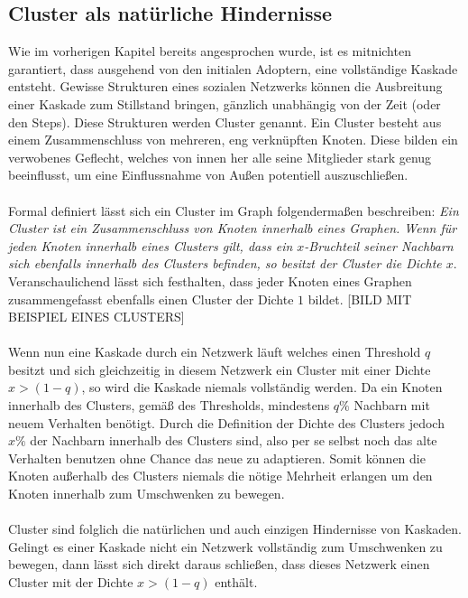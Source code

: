 \documentclass[12pt]{article}
\begin{document}
\subsection{Cluster als natürliche Hindernisse}
\label{ss_cluster}
Wie im vorherigen Kapitel bereits angesprochen wurde, ist es mitnichten garantiert, dass ausgehend von den initialen Adoptern, eine vollständige Kaskade entsteht. Gewisse Strukturen eines sozialen Netzwerks können die Ausbreitung einer Kaskade zum Stillstand bringen, gänzlich unabhängig von der Zeit (oder den Steps). Diese Strukturen werden Cluster genannt. Ein Cluster besteht aus einem Zusammenschluss von mehreren, eng verknüpften Knoten. Diese bilden ein verwobenes Geflecht, welches von innen her alle seine Mitglieder stark genug beeinflusst, um eine Einflussnahme von Außen potentiell auszuschließen.\\\\
Formal definiert lässt sich ein Cluster im Graph folgendermaßen beschreiben: \emph{Ein Cluster ist ein Zusammenschluss von Knoten innerhalb eines Graphen. Wenn für jeden Knoten innerhalb eines Clusters gilt, dass ein $x$-Bruchteil seiner Nachbarn sich ebenfalls innerhalb des Clusters befinden, so besitzt der Cluster die Dichte $x$}. Veranschaulichend lässt sich festhalten, dass jeder Knoten eines Graphen zusammengefasst ebenfalls einen Cluster der Dichte $1$ bildet.
[BILD MIT BEISPIEL EINES CLUSTERS]\\\\
Wenn nun eine Kaskade durch ein Netzwerk läuft welches einen Threshold $q$ besitzt und sich gleichzeitig in diesem Netzwerk ein Cluster mit einer Dichte $x > (1-q)$, so wird die Kaskade niemals vollständig werden. Da ein Knoten innerhalb des Clusters, gemäß des Thresholds, mindestens $q\%$ Nachbarn mit neuem Verhalten benötigt. Durch die Definition der Dichte des Clusters jedoch $x\%$ der Nachbarn innerhalb des Clusters sind, also per se selbst noch das alte Verhalten benutzen ohne Chance das neue zu adaptieren. Somit können die Knoten außerhalb des Clusters niemals die nötige Mehrheit erlangen um den Knoten innerhalb zum Umschwenken zu bewegen. \\\\
Cluster sind folglich die natürlichen und auch einzigen Hindernisse von Kaskaden. Gelingt es einer Kaskade nicht ein Netzwerk vollständig zum Umschwenken zu bewegen, dann lässt sich direkt daraus schließen, dass dieses Netzwerk einen Cluster mit der Dichte $x > (1-q)$ enthält.

 
\end{document}

